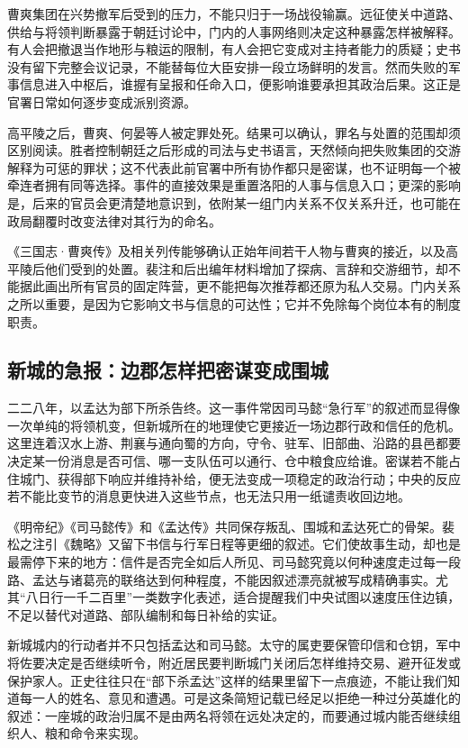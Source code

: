 曹爽集团在兴势撤军后受到的压力，不能只归于一场战役输赢。远征使关中道路、供给与将领判断暴露于朝廷讨论中，门内的人事网络则决定这种暴露怎样被解释。有人会把撤退当作地形与粮运的限制，有人会把它变成对主持者能力的质疑；史书没有留下完整会议记录，不能替每位大臣安排一段立场鲜明的发言。然而失败的军事信息进入中枢后，谁握有呈报和任命入口，便影响谁要承担其政治后果。这正是官署日常如何逐步变成派别资源。

高平陵之后，曹爽、何晏等人被定罪处死。结果可以确认，罪名与处置的范围却须区别阅读。胜者控制朝廷之后形成的司法与史书语言，天然倾向把失败集团的交游解释为可惩的罪状；这不代表此前官署中所有协作都只是密谋，也不证明每一个被牵连者拥有同等选择。事件的直接效果是重置洛阳的人事与信息入口；更深的影响是，后来的官员会更清楚地意识到，依附某一组门内关系不仅关系升迁，也可能在政局翻覆时改变法律对其行为的命名。

\begin{sourcenote}
《三国志·曹爽传》及相关列传能够确认正始年间若干人物与曹爽的接近，以及高平陵后他们受到的处置。裴注和后出编年材料增加了探病、言辞和交游细节，却不能据此画出所有官员的固定阵营，更不能把每次推荐都还原为私人交易。门内关系之所以重要，是因为它影响文书与信息的可达性；它并不免除每个岗位本有的制度职责。
\end{sourcenote}

\subsection{新城的急报：边郡怎样把密谋变成围城}

二二八年，以孟达为部下所杀告终。这一事件常因司马懿“急行军”的叙述而显得像一次单纯的将领机变，但新城所在的地理使它更接近一场边郡行政和信任的危机。这里连着汉水上游、荆襄与通向蜀的方向，守令、驻军、旧部曲、沿路的县邑都要决定某一份消息是否可信、哪一支队伍可以通行、仓中粮食应给谁。密谋若不能占住城门、获得部下响应并维持补给，便无法变成一项稳定的政治行动；中央的反应若不能比变节的消息更快进入这些节点，也无法只用一纸谴责收回边地。

《明帝纪》《司马懿传》和《孟达传》共同保存叛乱、围城和孟达死亡的骨架。裴松之注引《魏略》又留下书信与行军日程等更细的叙述。它们使故事生动，却也是最需停下来的地方：信件是否完全如后人所见、司马懿究竟以何种速度走过每一段路、孟达与诸葛亮的联络达到何种程度，不能因叙述漂亮就被写成精确事实。尤其“八日行一千二百里”一类数字化表述，适合提醒我们中央试图以速度压住边镇，不足以替代对道路、部队编制和每日补给的实证。

新城城内的行动者并不只包括孟达和司马懿。太守的属吏要保管印信和仓钥，军中将佐要决定是否继续听令，附近居民要判断城门关闭后怎样维持交易、避开征发或保护家人。正史往往只在“部下杀孟达”这样的结果里留下一点痕迹，不能让我们知道每一人的姓名、意见和遭遇。可是这条简短记载已经足以拒绝一种过分英雄化的叙述：一座城的政治归属不是由两名将领在远处决定的，而要通过城内能否继续组织人、粮和命令来实现。

